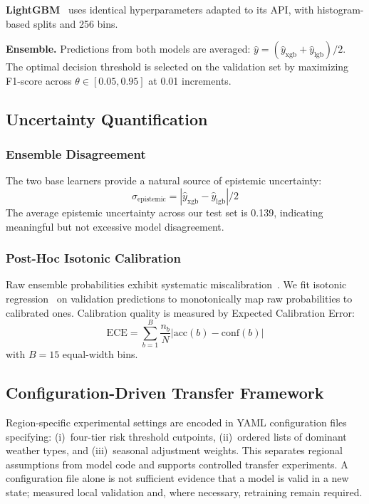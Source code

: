 \documentclass[conference]{IEEEtran}
\begin{document}
\textbf{LightGBM}~\cite{ke2017lightgbm} uses identical hyperparameters adapted to its API, with histogram-based splits and 256 bins.

\textbf{Ensemble.} Predictions from both models are averaged: $\hat{y} = (\hat{y}_{\text{xgb}} + \hat{y}_{\text{lgb}})/2$. The optimal decision threshold is selected on the validation set by maximizing F1-score across $\theta \in [0.05, 0.95]$ at 0.01 increments.

\subsection{Uncertainty Quantification}

\subsubsection{Ensemble Disagreement}
The two base learners provide a natural source of epistemic uncertainty:
\begin{equation}
    \sigma_{\text{epistemic}} = \left|\hat{y}_{\text{xgb}} - \hat{y}_{\text{lgb}}\right| / 2
\end{equation}
The average epistemic uncertainty across our test set is 0.139, indicating meaningful but not excessive model disagreement.

\subsubsection{Post-Hoc Isotonic Calibration}
Raw ensemble probabilities exhibit systematic miscalibration~\cite{guo2017calibration}. We fit isotonic regression~\cite{zadrozny2002isotonic} on validation predictions to monotonically map raw probabilities to calibrated ones. Calibration quality is measured by Expected Calibration Error:
\begin{equation}\label{eq:ece}
    \text{ECE} = \sum_{b=1}^{B} \frac{n_b}{N} \left|\text{acc}(b) - \text{conf}(b)\right|
\end{equation}
with $B=15$ equal-width bins.

\subsection{Configuration-Driven Transfer Framework}

Region-specific experimental settings are encoded in YAML configuration files specifying: (i)~four-tier risk threshold cutpoints, (ii)~ordered lists of dominant weather types, and (iii)~seasonal adjustment weights. This separates regional assumptions from model code and supports controlled transfer experiments. A configuration file alone is not sufficient evidence that a model is valid in a new state; measured local validation and, where necessary, retraining remain required.
\end{document}
